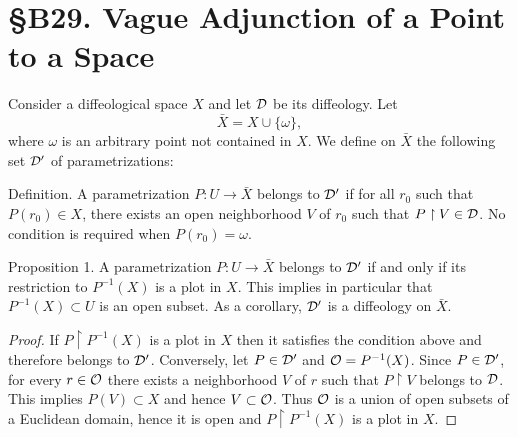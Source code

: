 
\chapter*{\S B29. Vague Adjunction of a Point to a Space}


\begin{abstract}
  We add a point to a diffeological space,
  counting for nothing,
  and we look at the consequences.
\end{abstract}


Consider a diffeological space $X$ and let $\mathcal{D}$ be its diffeology.
Let
$$
  \bar X = X \cup \{\omega\},
$$
where $\omega$ is an arbitrary point not contained in $X$.
We define on $\bar X$ the following set $\mathcal{D}'$ of parametrizations:

\begin{Article}{Definition.}{}
  A parametrization $P : U \to \bar X$ belongs to $\mathcal{D}'$ if for all $r_0$ such that $P(r_0) \in X$,
  there exists an open neighborhood $V$ of $r_0$ such that $P \restriction V \in \mathcal{D}$.
  No condition is required when $P(r_0) = \omega$.
\end{Article}

\begin{Article}{Proposition 1.}{}
  A parametrization $P : U \to \bar X$ belongs to $\mathcal{D}'$ if and only if its restriction to $P^{-1}(X)$ is a plot in $X$.
  This implies in particular that $P^{-1}(X) \subset U$ is an open subset.
  As a corollary,
  $\mathcal{D}'$ is a diffeology on $\bar X$.
\end{Article}

\begin{proof}
  If $P \restriction P^{-1}(X)$ is a plot in $X$ then it satisfies the condition above and therefore belongs to $\mathcal{D}'$.
  Conversely,
  let $P \in \mathcal{D}'$ and $\mathcal{O} = P^{-1}(X)$.
  Since $P \in \mathcal{D}'$,
  for every $r \in \mathcal{O}$ there exists a neighborhood $V$ of $r$ such that $P \restriction V$ belongs to $\mathcal{D}$.
  This implies $P(V) \subset X$ and hence $V \subset \mathcal{O}$.
  Thus $\mathcal{O}$ is a union of open subsets of a Euclidean domain,
  hence it is open and $P \restriction P^{-1}(X)$ is a plot in $X$.
\end{proof}


